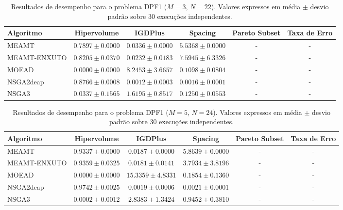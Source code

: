 
\begin{table}[htpb]
\centering
\caption{Resultados de desempenho para o problema DPF1 ($M=3$, $N=22$). Valores expressos em média $\pm$ desvio padrão sobre 30 execuções independentes.}
\label{tab:DPF1_M3_N22}
\begin{tabular}{lccccc}
\hline\hline
Algoritmo & Hipervolume & IGDPlus & Spacing & Pareto Subset & Taxa de Erro \\
\hline
MEAMT & $0.7897 \pm 0.0000$ & $0.0336 \pm 0.0000$ & $5.5368 \pm 0.0000$ & - & - \\
MEAMT-ENXUTO & $0.8205 \pm 0.0370$ & $0.0232 \pm 0.0183$ & $7.5945 \pm 6.3326$ & - & - \\
MOEAD & $0.0000 \pm 0.0000$ & $8.2453 \pm 3.6657$ & $0.1098 \pm 0.0804$ & - & - \\
NSGA2deap & $0.8766 \pm 0.0008$ & $0.0012 \pm 0.0003$ & $0.0016 \pm 0.0001$ & - & - \\
NSGA3 & $0.0337 \pm 0.1565$ & $1.6195 \pm 0.8517$ & $0.1250 \pm 0.0553$ & - & - \\
\hline\hline
\end{tabular}
\end{table}

\begin{table}[htpb]
\centering
\caption{Resultados de desempenho para o problema DPF1 ($M=5$, $N=24$). Valores expressos em média $\pm$ desvio padrão sobre 30 execuções independentes.}
\label{tab:DPF1_M5_N24}
\begin{tabular}{lccccc}
\hline\hline
Algoritmo & Hipervolume & IGDPlus & Spacing & Pareto Subset & Taxa de Erro \\
\hline
MEAMT & $0.9337 \pm 0.0000$ & $0.0187 \pm 0.0000$ & $5.8639 \pm 0.0000$ & - & - \\
MEAMT-ENXUTO & $0.9359 \pm 0.0325$ & $0.0181 \pm 0.0141$ & $3.7934 \pm 3.8196$ & - & - \\
MOEAD & $0.0000 \pm 0.0000$ & $15.3359 \pm 4.8331$ & $0.1854 \pm 0.1360$ & - & - \\
NSGA2deap & $0.9742 \pm 0.0025$ & $0.0019 \pm 0.0006$ & $0.0021 \pm 0.0001$ & - & - \\
NSGA3 & $0.0002 \pm 0.0012$ & $2.8383 \pm 1.3424$ & $0.9452 \pm 0.3810$ & - & - \\
\hline\hline
\end{tabular}
\end{table}

